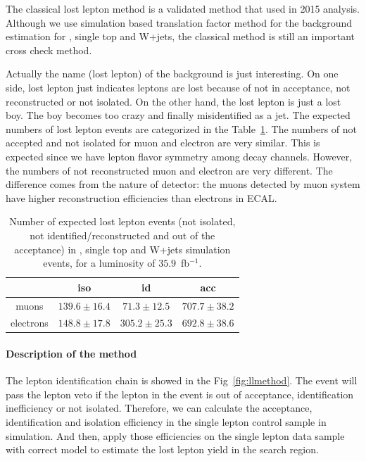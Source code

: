 The classical lost lepton method is a validated method that used in 2015 analysis\cite{PhysRevD.96.012004}. Although we use simulation based translation factor method for the background estimation for \ttbar, single top and W+jets, the classical method is still an important cross check method. 

Actually the name (lost lepton) of the background is just interesting. On one side, lost lepton just indicates leptons are lost because of not in acceptance, not reconstructed or not isolated. On the other hand, the lost lepton is just a lost boy. The boy becomes too crazy and finally misidentified as a jet. The expected numbers of lost lepton events are categorized in the Table~\ref{tab:nexpLL}. The numbers of not accepted and not isolated for muon and electron are very similar. This is expected since we have lepton flavor symmetry among \ttbar decay channels. However, the numbers of not reconstructed muon and electron are very different. The difference comes from the nature of detector: the muons detected by muon system have higher reconstruction efficiencies than electrons in ECAL. 

\begin{table}[htbp]
\fontsize{10 pt}{1.2 em}
\caption{Number of expected lost lepton events (not isolated, not identified/reconstructed and out of the acceptance) in \ttbar, single top and W+jets simulation events, for a luminosity of $35.9$~fb$^{-1}$.} 
\begin{center}
\begin{tabular}{|c|c|c|c|}
\hline
          & iso  & id   & acc \\
\hline
muons     & $139.6\pm16.4$ & $71.3\pm12.5$ & $707.7\pm38.2$ \\
electrons & $148.8\pm17.8$ & $305.2\pm25.3$ & $692.8\pm38.6$ \\
\hline\end{tabular}
\end{center}
\label{tab:nexpLL}
\end{table}

\paragraph{Description of the method}

The lepton identification chain is showed in the Fig~\ref{fig:llmethod}. The event will pass the lepton veto if the lepton in the event is out of acceptance, identification inefficiency or not isolated. Therefore, we can calculate the acceptance, identification and isolation efficiency in the single lepton control sample in simulation. And then, apply those efficiencies on the single lepton data sample with correct model to estimate the lost lepton yield in the search region. 


